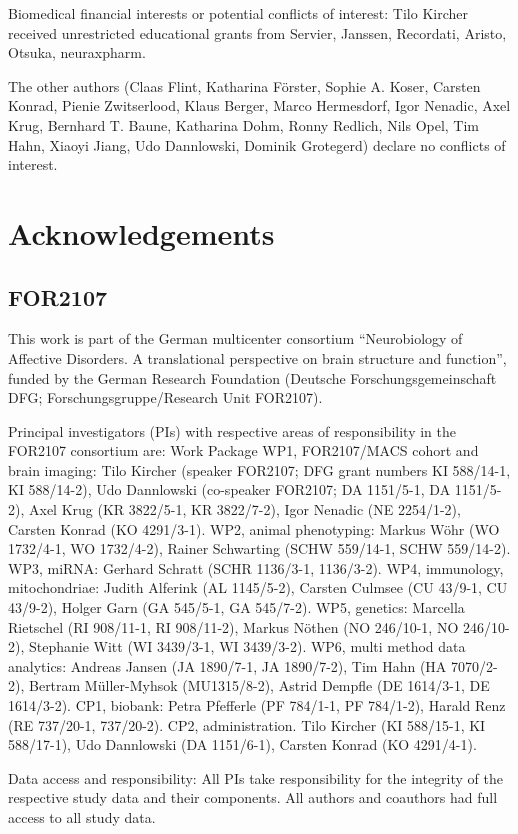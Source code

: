 \documentclass{article}
\begin{document}
    Biomedical financial interests or potential conflicts of interest: Tilo Kircher received unrestricted educational grants from Servier, Janssen, Recordati, Aristo, Otsuka, neuraxpharm.

    The other authors (Claas Flint, Katharina Förster, Sophie A. Koser, Carsten Konrad, Pienie Zwitserlood, Klaus Berger, Marco Hermesdorf, Igor Nenadic, Axel Krug, Bernhard T. Baune, Katharina Dohm, Ronny Redlich, Nils Opel, Tim Hahn, Xiaoyi Jiang, Udo Dannlowski, Dominik Grotegerd) declare no conflicts of interest.

    \section*{Acknowledgements}
    \subsection*{FOR2107}
    This work is part of the German multicenter consortium “Neurobiology of Affective Disorders. A translational perspective on brain structure and function”, funded by the German Research Foundation (Deutsche Forschungsgemeinschaft DFG; Forschungsgruppe/Research Unit FOR2107).

    Principal investigators (PIs) with respective areas of responsibility in the FOR2107 consortium are:
    Work Package WP1, FOR2107/MACS cohort and brain imaging: Tilo Kircher (speaker FOR2107; DFG grant numbers KI 588/14-1, KI 588/14-2), Udo Dannlowski (co-speaker FOR2107; DA 1151/5-1, DA 1151/5-2), Axel Krug (KR 3822/5-1, KR 3822/7-2), Igor Nenadic (NE 2254/1-2), Carsten Konrad (KO 4291/3-1). WP2, animal phenotyping: Markus Wöhr (WO 1732/4-1, WO 1732/4-2), Rainer Schwarting (SCHW 559/14-1, SCHW 559/14-2). WP3, miRNA: Gerhard Schratt (SCHR 1136/3-1, 1136/3-2). WP4, immunology, mitochondriae: Judith Alferink (AL 1145/5-2), Carsten Culmsee (CU 43/9-1, CU 43/9-2), Holger Garn (GA 545/5-1, GA 545/7-2). WP5, genetics: Marcella Rietschel (RI 908/11-1, RI 908/11-2), Markus Nöthen (NO 246/10-1, NO 246/10-2), Stephanie Witt (WI 3439/3-1, WI 3439/3-2). WP6, multi method data analytics: Andreas Jansen (JA 1890/7-1, JA 1890/7-2), Tim Hahn (HA 7070/2-2), Bertram Müller-Myhsok (MU1315/8-2), Astrid Dempfle (DE 1614/3-1, DE 1614/3-2). CP1, biobank: Petra Pfefferle (PF 784/1-1, PF 784/1-2), Harald Renz (RE 737/20-1, 737/20-2). CP2, administration. Tilo Kircher (KI 588/15-1, KI 588/17-1), Udo Dannlowski (DA 1151/6-1), Carsten Konrad (KO 4291/4-1).

    Data access and responsibility: All PIs take responsibility for the integrity of the respective study data and their components. All authors and coauthors had full access to all study data.
\end{document}
